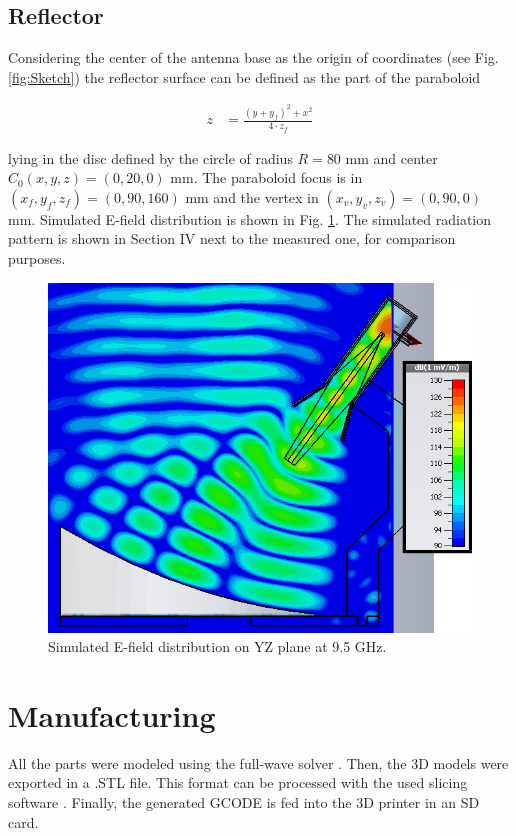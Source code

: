 \documentclass{IEEEtran}
\begin{document}
\subsection{Reflector}

Considering the center of the antenna base as the origin of coordinates (see Fig. \ref{fig:Sketch}) the reflector surface can be defined as the part of the paraboloid

\begin{align*}
z&=\frac{(y+y_f)^2+x^2}{4 \cdot z_f}
\end{align*}

lying in the disc defined by the circle of radius $R=80$ mm and center $C_0(x,y,z)=(0,20,0)$ mm. The paraboloid focus is in $(x_f,y_f,z_f)=(0,90,160)$ mm and the vertex in $(x_v,y_v,z_v)=(0,90,0)$ mm. Simulated E-field distribution is shown in Fig. \ref{fig:E-field_REFL}. The simulated radiation pattern is shown in Section IV next to the measured one, for comparison purposes.

\begin{figure}[h]
	\centerline{\includegraphics[width=0.92\columnwidth]{images/Reflector.png}}
	\caption{Simulated E-field distribution on YZ plane at 9.5 GHz.}
	\label{fig:E-field_REFL}
\end{figure}

\section{Manufacturing}

All the parts were modeled using the full-wave solver \cite{ref:cst}. Then, the 3D models were exported in a .STL file. This format can be processed with the used slicing software \cite{ref:cura3D}. Finally, the generated GCODE is fed into the 3D printer in an SD card.
\end{document}
